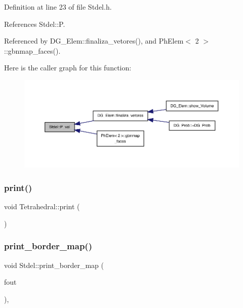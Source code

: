 Definition at line 23 of file Stdel.\+h.



References Stdel\+::P.



Referenced by D\+G\+\_\+\+Elem\+::finaliza\+\_\+vetores(), and Ph\+Elem$<$ 2 $>$\+::gbnmap\+\_\+faces().

Here is the caller graph for this function\+:
\nopagebreak
\begin{figure}[H]
\begin{center}
\leavevmode
\includegraphics[width=350pt]{classStdel_a701c7d5595d4f6632333c4202898983b_icgraph}
\end{center}
\end{figure}
\mbox{\label{classTetrahedral_acd3b75bf44c11339f2d7601385707cb6}} 
\subsubsection{\texorpdfstring{print()}{print()}}
{\footnotesize\ttfamily void Tetrahedral\+::print (\begin{DoxyParamCaption}\item[{F\+I\+LE $\ast$}]{ }\end{DoxyParamCaption})}

\mbox{\label{classStdel_a9a0c69dca7564f6ca4aa4f3c9864ea01}} 
\subsubsection{\texorpdfstring{print\+\_\+border\+\_\+map()}{print\_border\_map()}}
{\footnotesize\ttfamily void Stdel\+::print\+\_\+border\+\_\+map (\begin{DoxyParamCaption}\item[{F\+I\+LE $\ast$}]{fout }\end{DoxyParamCaption})\hspace{0.3cm}{\ttfamily [inline]}, {\ttfamily [inherited]}}



